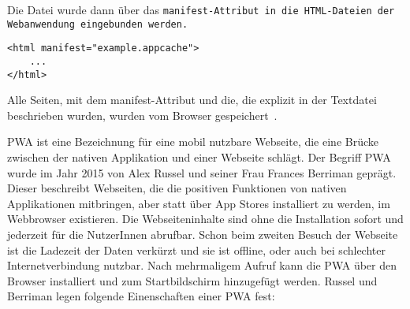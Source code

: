 Die Datei wurde dann über das \tt{manifest}-Attribut in die \gls{HTML}-Dateien der Webanwendung eingebunden werden.
\begin{lstlisting}
<html manifest="example.appcache">
    ...
</html>
\end{lstlisting}
Alle Seiten, mit dem manifest-Attribut und die, die explizit in der Textdatei beschrieben wurden, wurden vom Browser gespeichert~\cite{appcache}.

%
%
%
%
\Gls{PWA} ist eine Bezeichnung für eine mobil nutzbare Webseite, die eine Brücke zwischen der nativen
Applikation und einer Webseite schlägt.
Der Begriff \gls{PWA} wurde im Jahr 2015  von Alex Russel und seiner Frau Frances Berriman geprägt.
Dieser beschreibt Webseiten, die die positiven Funktionen von nativen Applikationen mitbringen, aber statt über App Stores installiert zu werden, im Webbrowser existieren. Die Webseiteninhalte sind ohne die Installation sofort und jederzeit für die NutzerInnen abrufbar. Schon beim zweiten Besuch der Webseite ist die Ladezeit der Daten verkürzt und sie ist offline, oder auch bei schlechter Internetverbindung nutzbar. Nach mehrmaligem Aufruf kann die \gls{PWA} über den Browser installiert und zum Startbildschirm hinzugefügt werden. Russel und Berriman legen folgende Einenschaften einer \gls{PWA} fest:
